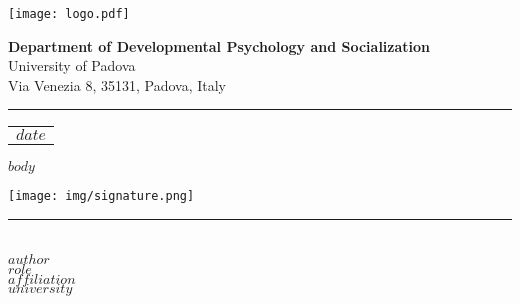 \documentclass[12pt,a4paper]{letter}
\begin{document}
	\begin{minipage}[c]{0.25\linewidth}
			\centering
			\texttt{[image: logo.pdf]}
			\vspace{-0.5em}
	\end{minipage}
\hfill %
    \begin{minipage}[c]{21.5em}
        \raggedright
        \footnotesize{\textbf{\textcolor{unipd}{Department of Developmental Psychology and Socialization}}} \\
        \footnotesize{University of Padova} \\
        \footnotesize{Via Venezia 8, 35131, Padova, Italy}
    \end{minipage}
\vspace{3em}%
\rule{\linewidth}{1pt} %
\vspace{-3em}%

\hfill
\begin{tabular}{l @{}}
	$date$ \\ %
\end{tabular}
\vspace{2em}

$body$

\texttt{[image: img/signature.png]}\\
\rule{5cm}{1pt} \\%
\small{\textbf{\textcolor{unipd}{$author$}}} \\
\small{$role$}\\
\small{$affiliation$} \\
\small{$university$} \\
\end{document}
